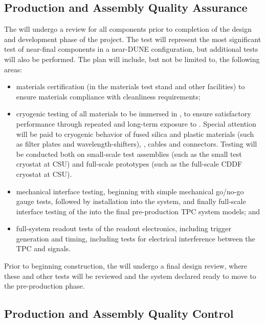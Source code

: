 \subsection{Production and Assembly Quality Assurance}
\label{sec:fdsp-pd-prodqa}

The  will undergo a  review for all components prior to completion of the design and development phase of the project.  The  test will represent the most significant test of near-final  components in a near-DUNE configuration, but additional tests will also be performed.  The  plan will include, but not be limited to, the following areas:

\begin{itemize}
\item materials certification (in the  materials test stand and other facilities) to ensure materials compliance with cleanliness requirements;
\item cryogenic testing of all materials to be immersed in \lar, to ensure satisfactory performance through repeated and long-term exposure to \lar{}.  Special attention will be paid to cryogenic behavior of fused silica and plastic materials (such as filter plates and wavelength-shifters), , cables and connectors.  Testing will be conducted both on small-scale test assemblies (such as the small test cryostat at CSU) and full-scale prototypes (such as the full-scale CDDF cryostat at CSU). 
\item mechanical interface testing, beginning with simple mechanical go/no-go gauge tests, followed by installation into the  system, and finally full-scale interface testing of the  into the final pre-production TPC system models; and
\item full-system readout tests of the  readout electronics, including trigger generation and timing, including tests for electrical interference between the TPC and  signals.
\end{itemize}


Prior to beginning construction, the  will undergo a final design review, where these and other  tests will be reviewed and the system declared ready to move to the pre-production phase.


\subsection{Production and Assembly Quality Control}
\label{sec:fdsp-pd-prodqc}


